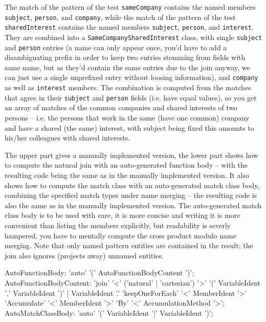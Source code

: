 The match of the pattern of the test \texttt{sameCompany} contains the named members \texttt{subject}, \texttt{person}, and \texttt{company}, while the match of the pattern of the test \texttt{sharedInterest} contains the named members \texttt{subject}, \texttt{person}, and \texttt{interest}.
They are combined into a \texttt{SameCompanySharedInterest} class, with single \texttt{subject} and \texttt{person} entries (a name can only appear once, you'd have to add a disambiguating prefix in order to keep two entries stemming from fields with same name, but as they'd contain the same entries due to the join anyway, we can just use a single unprefixed entry without loosing information), and \texttt{company} as well as \texttt{interest} members.
The combination is computed from the matches that agree in their \texttt{subject} and \texttt{person} fields (i.e. have equal values), so you get an array of matches of the common companies and shared interests of two persons -- i.e. the persons that work in the same (have one common) company and have a shared (the same) interest, with subject being fixed this amounts to his/her colleagues with shared interests.

The upper part gives a manually implemented version, the lower part shows how to compute the natural join with an auto-generated function body -- with the resulting code being the same as in the manually implemented version.
It also shows how to compute the match class with an auto-generated match class body, combining the specified match types under name merging -- the resulting code is also the same as in the manually implemented version.
The auto-generated match class body is to be used with care, it is more concise and writing it is more convenient than listing the members explicitly, but readability is severly hampered, you have to mentally compute the cross product modulo name merging.
Note that only named pattern entities are contained in the result; the join also ignores (projects away) unnamed entities.

\begin{rail}
  AutoFunctionBody: 'auto' '(' AutoFunctionBodyContent ')';
  AutoFunctionBodyContent: 'join' '<' ('natural' | 'cartesian') '>' '(' VariableIdent ',' VariableIdent ')' | VariableIdent '.' 'keepOneForEach' '<' MemberIdent '>' \\ 'Accumulate' '<' MemberIdent '>' 'By' '<' AccumulationMethod '>';
  AutoMatchClassBody: 'auto' '(' VariableIdent '|' VariableIdent ')';
\end{rail}

